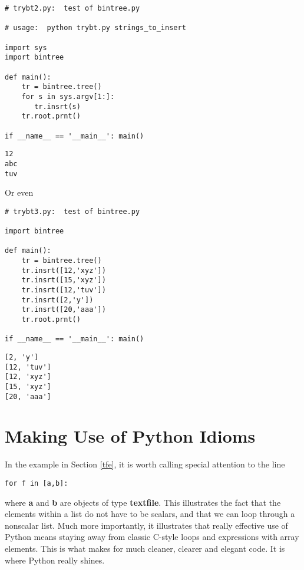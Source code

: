 \begin{Verbatim}[fontsize=\relsize{-2}]
# trybt2.py:  test of bintree.py

# usage:  python trybt.py strings_to_insert

import sys
import bintree

def main():
    tr = bintree.tree()
    for s in sys.argv[1:]:
       tr.insrt(s)
    tr.root.prnt()

if __name__ == '__main__': main()
\end{Verbatim}

\begin{Verbatim}[fontsize=\relsize{-2}]
% python trybt2.py abc tuv 12
12
abc
tuv
\end{Verbatim}

Or even

\begin{Verbatim}[fontsize=\relsize{-2}]
# trybt3.py:  test of bintree.py

import bintree

def main():
    tr = bintree.tree()
    tr.insrt([12,'xyz'])
    tr.insrt([15,'xyz'])
    tr.insrt([12,'tuv'])
    tr.insrt([2,'y'])
    tr.insrt([20,'aaa'])
    tr.root.prnt()

if __name__ == '__main__': main()
\end{Verbatim}

\begin{Verbatim}[fontsize=\relsize{-2}]
% python trybt3.py
[2, 'y']
[12, 'tuv']
[12, 'xyz']
[15, 'xyz']
[20, 'aaa']
\end{Verbatim}

\section{Making Use of Python Idioms} 
\label{idiom}

In the example in Section \ref{tfe}, it is worth calling special
attention to the line

\begin{Verbatim}[fontsize=\relsize{-2}]
for f in [a,b]:
\end{Verbatim}

where {\bf a} and {\bf b} are objects of type {\bf textfile}.  This
illustrates the fact that the elements within a list do not have to be
scalars, and that we can loop through a nonscalar list.  Much more
importantly, it illustrates that really effective use of Python means
staying away from classic C-style loops and expressions with array
elements.  This is what makes for much cleaner, clearer and elegant
code.  It is where Python really shines.  

